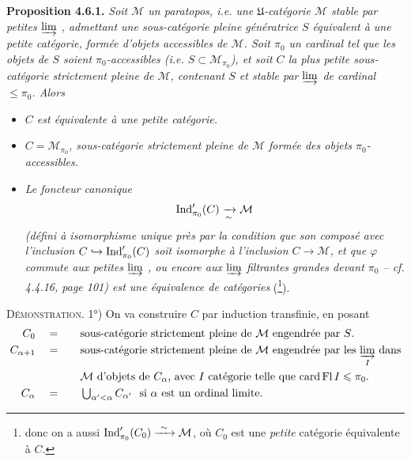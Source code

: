 \textbf{Proposition 4.6.1.} \textit{Soit $\mathcal{M}$ un paratopos, i.e. une $\mathfrak{U}$-catégorie $\mathcal{M}$ stable par petites $\varinjlim$ , admettant une sous-catégorie pleine génératrice $S$ équivalent à une petite catégorie, formée d'objets accessibles de $\mathcal{M}$. Soit $\pi_0$ un cardinal tel que les objets de $S$ soient $\pi_0$-accessibles (i.e. $S\subset\mathcal{M}_{\pi_0}$), et soit $C$ la plus petite sous-catégorie strictement pleine de $\mathcal{M}$, contenant $S$ et stable par $\varinjlim$ de cardinal $\leqslant\pi_0$. Alors} %
\begin{itemize}[leftmargin=2.5em]
\item[\textit{1°)}] \textit{$C$ est équivalente à une petite catégorie.}


\item[\textit{2°)}] \textit{$C=\mathcal{M}_{\pi_0}$, sous-catégorie strictement pleine de $\mathcal{M}$ formée des objets $\pi_0$-accessibles.}
\item[\textit{3°)}] \textit{Le foncteur canonique}
\[
\Ind'_{\pi_0}(C) \xrightarrow[\sim]{} \mathcal{M} %
\]
\textit{(défini à isomorphisme unique près par la condition que son composé avec l'inclusion $C\hookrightarrow\operatorname{Ind}'_{\pi_0}(C)$ soit isomorphe à l'inclusion $C\longrightarrow\mathcal{M}$, et que $\varphi$ commute aux petites $\varinjlim$ , ou encore aux $\varinjlim$ filtrantes grandes devant $\pi_0$ – cf. 4.4.16, page 101) est une équivalence de catégories} (\footnote[54]{donc on a aussi $\operatorname{Ind}'_{\pi_0}(C_0)\xrightarrow{\ \sim\ }\mathcal{M}$, où $C_0$ est une \textit{petite} catégorie équivalente à $C$.}).
\end{itemize}

\textsc{Démonstration}. 1°) On va construire $C$ par induction transfinie, en posant
\[
\begin{aligned}
C_0 &\quad=\quad && \text{sous-catégorie strictement pleine de $\mathcal{M}$ engendrée par $S$.}\\
C_{\alpha+1} &\quad=\quad && \text{sous-catégorie strictement pleine de $\mathcal{M}$ engendrée par les $\varinjlim\limits_{I}$ dans}\\
& && \text{$\mathcal{M}$ d'objets de $C_\alpha$, avec $I$ catégorie telle que $\operatorname{card}\operatorname{Fl}I\leqslant\pi_0$.}\\
C_\alpha &\quad=\quad && \textstyle\bigcup_{\alpha'<\alpha}C_{\alpha'}\ \text{ si $\alpha$ est un ordinal limite.}
\end{aligned}
\]

